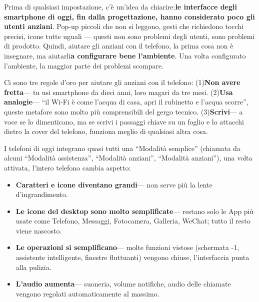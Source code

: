 


Prima di qualsiasi impostazione, c'è un'idea da chiarire:\textbf{le interfacce degli smartphone di oggi, fin dalla progettazione, hanno considerato poco gli utenti anziani}. Pop-up piccoli che non si leggono, gesti che richiedono tocchi precisi, icone tutte uguali — questi non sono problemi degli utenti, sono problemi di prodotto. Quindi, aiutare gli anziani con il telefono, la prima cosa non è insegnare, ma aiutarli\textbf{a configurare bene l'ambiente}. Una volta configurato l'ambiente, la maggior parte dei problemi scompare.

Ci sono tre regole d'oro per aiutare gli anziani con il telefono: (1)\textbf{Non avere fretta}— tu usi smartphone da dieci anni, loro magari da tre mesi. (2)\textbf{Usa analogie}— “il Wi-Fi è come l'acqua di casa, apri il rubinetto e l'acqua scorre”, queste metafore sono molto più comprensibili del gergo tecnico. (3)\textbf{Scrivi}— a voce se lo dimenticano, ma se scrivi i passaggi chiave su un foglio e lo attacchi dietro la cover del telefono, funziona meglio di qualsiasi altra cosa.


I telefoni di oggi integrano quasi tutti una “Modalità semplice” (chiamata da alcuni “Modalità assistenza”, “Modalità anziani”, “Modalità anziani”), una volta attivata, l'intero telefono cambia aspetto:

\begin{itemize}
  \item \textbf{Caratteri e icone diventano grandi}— non serve più la lente d'ingrandimento.
  \item \textbf{Le icone del desktop sono molto semplificate}— restano solo le App più usate come Telefono, Messaggi, Fotocamera, Galleria, WeChat; tutto il resto viene nascosto.
  \item \textbf{Le operazioni si semplificano}— molte funzioni vistose (schermata -1, assistente intelligente, finestre fluttuanti) vengono chiuse, l'interfaccia punta alla pulizia.
  \item \textbf{L'audio aumenta}— suoneria, volume notifiche, audio delle chiamate vengono regolati automaticamente al massimo.
\end{itemize}

